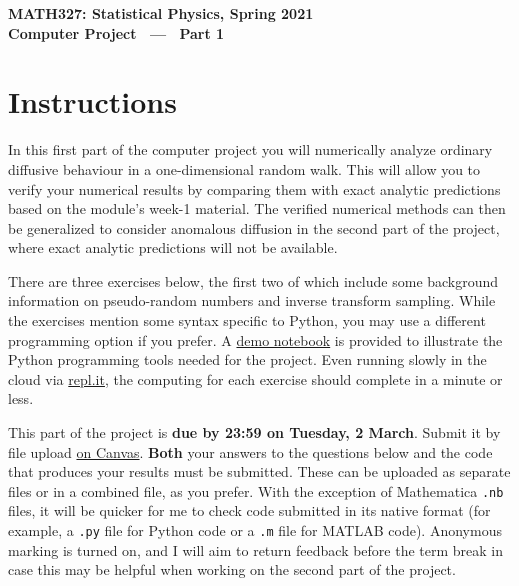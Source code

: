 \documentclass[12 pt]{article} %
\begin{document}
\newcommand{\thisweek}{MATH327 Project Part 1}
\newcommand{\moddate}{Last modified 14 Feb.~2021}
\begin{center}
  {\Large \textbf{MATH327: Statistical Physics, Spring 2021}} \\[12 pt]
  {\Large \textbf{Computer Project \ --- \ Part 1}} \\[24 pt]
\end{center}

\section*{Instructions}
In this first part of the computer project you will numerically analyze ordinary diffusive behaviour in a one-dimensional random walk.
This will allow you to verify your numerical results by comparing them with exact analytic predictions based on the module's week-1 material.
The verified numerical methods can then be generalized to consider anomalous diffusion in the second part of the project, where exact analytic predictions will not be available.

There are three exercises below, the first two of which include some background information on pseudo-random numbers and inverse transform sampling.
While the exercises mention some syntax specific to Python, you may use a different programming option if you prefer.
A \href{https://tinyurl.com/math327demo}{demo notebook} is provided to illustrate the Python programming tools needed for the project.
Even running slowly in the cloud via \href{https://repl.it}{repl.it}, the computing for each exercise should complete in a minute or less.

This part of the project is \textbf{due by 23:59 on Tuesday, 2 March}.
Submit it by file upload \href{https://liverpool.instructure.com/courses/19478/assignments/89666}{on Canvas}.
\textbf{Both} your answers to the questions below and the code that produces your results must be submitted.
These can be uploaded as separate files or in a combined file, as you prefer.
With the exception of Mathematica \texttt{.nb} files, it will be quicker for me to check code submitted in its native format (for example, a \texttt{.py} file for Python code or a \texttt{.m} file for MATLAB code).
Anonymous marking is turned on, and I will aim to return feedback before the term break in case this may be helpful when working on the second part of the project.
\end{document}
